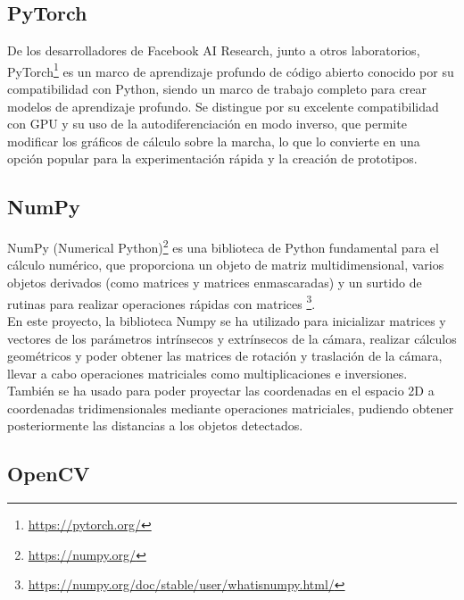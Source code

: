 \subsection{PyTorch}
\label{sec:PyTorch}

De los desarrolladores de Facebook AI Research, junto a otros laboratorios, PyTorch\footnote{\url{https://pytorch.org/}} es un marco de aprendizaje profundo de código abierto conocido por su compatibilidad con Python, siendo un marco de trabajo completo para crear modelos de aprendizaje profundo. Se distingue por su excelente compatibilidad con GPU y su uso de la autodiferenciación en modo inverso, que permite modificar los gráficos de cálculo sobre la marcha, lo que lo convierte en una opción popular para la experimentación rápida y la creación de prototipos.

\subsection{NumPy}
\label{sec:NumPy}

NumPy (Numerical Python)\footnote{\url{https://numpy.org/}} es una biblioteca de Python fundamental para el cálculo numérico, que proporciona un objeto de matriz multidimensional, varios objetos derivados (como matrices y matrices enmascaradas) y un surtido de rutinas para realizar operaciones rápidas con matrices \footnote{\url{https://numpy.org/doc/stable/user/whatisnumpy.html/}}.\\

En este proyecto, la biblioteca Numpy se ha utilizado para inicializar matrices y vectores de los parámetros intrínsecos y extrínsecos de la cámara, realizar cálculos geométricos y poder obtener las matrices de rotación y traslación de la cámara, llevar a cabo operaciones matriciales como multiplicaciones e inversiones. También se ha usado para poder proyectar las coordenadas en el espacio 2D a coordenadas tridimensionales mediante operaciones matriciales, pudiendo obtener posteriormente las distancias a los objetos detectados. 

\subsection{OpenCV}
\label{sec:OpenCV}

